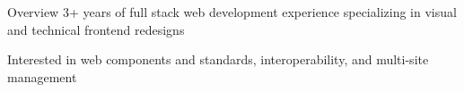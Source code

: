 \documentclass{resume} %
\begin{document}

  \begin{rSection}{Overview}
    3+ years of full stack web development experience specializing in visual and technical frontend redesigns

    Interested in web components and standards, interoperability, and multi-site management
  \end{rSection}
\end{document}

